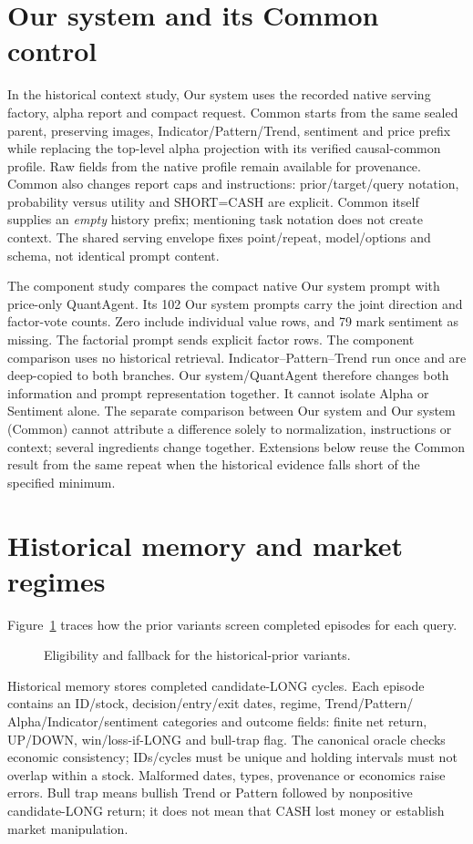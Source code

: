 \section{Our system and its Common control}\label{s:34c72d872d464412}
In the historical context study, Our system uses the recorded native serving factory,
alpha report and compact request. Common starts from the same sealed
parent, preserving images, Indicator/Pattern/Trend, sentiment and price
prefix while replacing the top-level alpha projection with its verified
causal-common profile. Raw fields from the native profile remain available for provenance.
Common also changes report caps and instructions: prior/target/query
notation, probability versus utility and SHORT=CASH are explicit. Common
itself supplies an \emph{empty} history prefix; mentioning task notation
does not create context. The shared serving envelope fixes point/repeat,
model/options and schema, not identical prompt content.

The component study compares the compact native Our system prompt with
price-only QuantAgent. Its 102 Our system prompts carry the joint
direction and factor-vote counts. Zero include individual value rows,
and 79 mark sentiment as missing. The factorial prompt sends explicit
factor rows. The component comparison uses no historical retrieval. Indicator--Pattern--Trend run once
and are deep-copied to both branches. Our system/QuantAgent therefore changes both
information and prompt representation together. It cannot isolate Alpha or Sentiment alone.
The separate comparison between Our system and Our system (Common)
cannot attribute a difference solely to normalization, instructions or
context; several ingredients change together. Extensions below reuse
the Common result from the same repeat when the historical evidence falls short of the specified minimum.

\section{Historical memory and market regimes}\label{s:caa6b0b420cdae1c}
Figure~\ref{fig:context-eligibility} traces how the prior variants screen completed episodes for each query.
\begin{figure}[!htb]\centering

\caption{Eligibility and fallback for the historical-prior variants.}\label{fig:context-eligibility}
\end{figure}
Historical memory stores completed candidate-LONG cycles. Each episode
contains an ID/stock, decision/entry/exit dates, regime, Trend/Pattern/
Alpha/Indicator/sentiment categories and outcome fields: finite net return,
UP/DOWN, win/loss-if-LONG and bull-trap flag. The canonical oracle checks
economic consistency; IDs/cycles must be unique and holding intervals
must not overlap within a stock. Malformed dates, types, provenance or
economics raise errors. Bull trap means bullish Trend or Pattern followed
by nonpositive candidate-LONG return; it does not mean that CASH lost
money or establish market manipulation.


